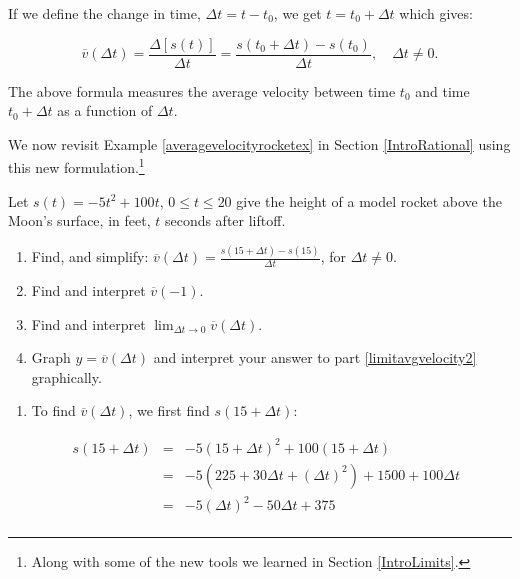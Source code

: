 \documentclass{ximera}
\begin{document}
If we define the change in time, $\Delta t = t - t_{0}$, we get $t = t_{0} + \Delta t$  which gives:

\[ \overline{v}(\Delta t) =  \frac{\Delta [s(t)]}{\Delta t} =  \frac{s(t_{0} + \Delta t) - s(t_{0})}{\Delta t}, \quad \Delta t \neq 0. \]

The above formula measures the average velocity between time $t_{0}$ and time $t_{0} + \Delta t$ as a function of $\Delta t$.




We now revisit Example \ref{averagevelocityrocketex} in Section \ref{IntroRational} using this new formulation.\footnote{Along with some of the new tools we learned in Section \ref{IntroLimits}.}


\begin{example} \label{averagevelocityrocketexreprise} Let $s(t) = -5t^2+100t$, $0 \leq t \leq 20$ give the height of a model rocket above the Moon's surface, in feet,  $t$ seconds after liftoff.  

\begin{enumerate}

\item  Find, and simplify:  $\overline{v}(\Delta t)  =  \frac{s(15+ \Delta t) - s(15)}{\Delta t}$, for $\Delta t \neq 0$.

\item  Find and interpret $\overline{v}(-1)$.

\item  \label{limitavgvelocity2} Find and interpret $\lim_{\Delta t \rightarrow 0}  \overline{v}(\Delta t)$.

\item  Graph $y = \overline{v}(\Delta t)$ and interpret your answer to part \ref{limitavgvelocity2} graphically.

\end{enumerate}


\begin{explanation}

\begin{enumerate}

\item  To find $\overline{v}(\Delta t)$, we first find $s(15+\Delta t)$: 

\[ \begin{array}{rclr}  
  s(15+\Delta t) & = & -5(15+\Delta t)^2 + 100(15+\Delta t) & \\ 
  & = & -5(225+30 \Delta t + (\Delta t)^2) + 1500 + 100 \Delta t& \\
 & = & -5(\Delta t)^2 -50 \Delta t +375 & \\
 \end{array} \]


\end{enumerate}
\end{explanation}
\end{example}
\end{document}
